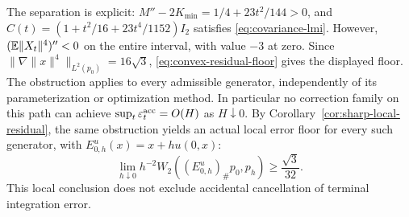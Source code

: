 The separation is explicit:
$M''-2K_{\min}=1/4+23t^2/144>0$, and
$C(t)=(1+t^2/16+23t^4/1152)I_2$ satisfies
\eqref{eq:covariance-lmi}.  However,
$(\mathbb E\|X_t\|^4)''<0$ on the entire interval, with value $-3$ at zero.
Since $\|\nabla\|x\|^4\|_{L^2(p_0)}=16\sqrt3$,
\eqref{eq:convex-residual-floor} gives the displayed floor.  The obstruction
applies to every admissible generator, independently of its
parameterization or optimization method.  In particular no correction
family on this path can achieve
$\sup_t\varepsilon_t^{\rm acc}=O(H)$ as $H\downarrow0$.
By Corollary~\ref{cor:sharp-local-residual}, the same obstruction yields
an actual local error floor for every such generator, with
$E^u_{0,h}(x)=x+hu(0,x)$:
\[
 \lim_{h\downarrow0}h^{-2}W_2((E^u_{0,h})_\#p_0,p_h)
 \ge\frac{\sqrt3}{32}.
\]
This local conclusion does not exclude accidental cancellation of
terminal integration error.
